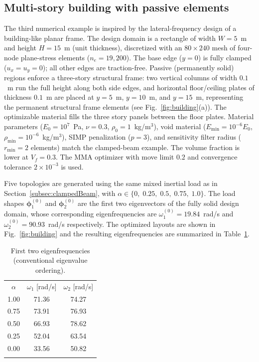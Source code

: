 \documentclass[pdflatex,lineno,sn-mathphys-ay]{sn-jnl}
\begin{document}
\subsection{Multi-story building with passive elements} \label{subsec:multi-storyBuilding}

The third numerical example is inspired by the lateral-frequency design of a building-like planar frame. The design domain is a rectangle of width $W=5$~m and height $H=15$~m (unit thickness), discretized with an $80\times 240$ mesh of four-node plane-stress elements ($n_e=19{,}200$). The base edge ($y=0$) is fully clamped ($u_x=u_y=0$); all other edges are traction-free. Passive (permanently solid) regions enforce a three-story structural frame: two vertical columns of width $0.1$~m run the full height along both side edges, and horizontal floor/ceiling plates of thickness $0.1$~m are placed at $y=5$~m, $y=10$~m, and $y=15$~m, representing the permanent structural frame elements (see Fig.~\ref{fig:building}(a)). The optimizable material fills the three story panels between the floor plates. Material parameters ($E_0=10^7$~Pa, $\nu=0.3$, $\rho_0=1$~kg/m$^3$), void material ($E_\mathrm{min}=10^{-6}E_0$, $\rho_\mathrm{min}=10^{-6}$~kg/m$^3$), SIMP penalization ($p=3$), and sensitivity filter radius ($r_{\min}=2$ elements) match the clamped-beam example. The volume fraction is lower at $V_f=0.3$. The MMA optimizer with move limit $0.2$ and convergence tolerance $2\times 10^{-3}$ is used.

Five topologies are generated using the same mixed inertial load as in Section~\ref{subsec:clampedBeam}, with $\alpha \in \{0,\;0.25,\;0.5,\;0.75,\;1.0\}$. The load shapes $\boldsymbol{\phi}_1^{(0)}$ and $\boldsymbol{\phi}_2^{(0)}$ are the first two eigenvectors of the fully solid design domain, whose corresponding eigenfrequencies are $\omega_1^{(0)}=19.84$~rad/s and $\omega_2^{(0)}=90.93$~rad/s respectively. The optimized layouts are shown in Fig.~\ref{fig:building} and the resulting eigenfrequencies are summarized in Table~\ref{tab:buildingFreq}.

\begin{table}[htbp]
\centering
\caption{First two eigenfrequencies (conventional eigenvalue ordering).}
\label{tab:buildingFreq}
\begin{tabular}{ccc}
\Xhline{1.2pt}
$\alpha$ & $\omega_1$ [rad/s] & $\omega_2$ [rad/s] \\
\Xhline{1.2pt}
1.00 & 71.36 & 74.27 \\
0.75 & 73.91 & 76.93 \\
0.50 & 66.93 & 78.62 \\
0.25 & 52.04 & 63.54 \\
0.00 & 33.56 & 50.82 \\
\Xhline{1.2pt}
\end{tabular}
\end{table}
\end{document}
